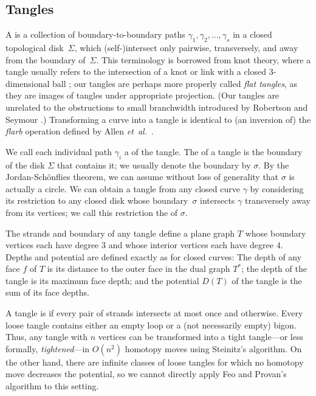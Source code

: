 \documentclass[11pt,twoside]{article}
\def\etal{\emph{et~al.}}			%
\let\EDIT\relax
\numberwithin{figure}{section}
\begin{document}
\subsection{Tangles}
\label{SS:tangles}

A  is a collection of boundary-to-boundary paths $\gamma_1, \gamma_2, \dots,\gamma_s$ in a closed topological disk~$\Sigma$, which (self-)intersect only pairwise, transversely, and away from the boundary of~$\Sigma$.  This terminology is borrowed from knot theory, where a tangle usually refers to the intersection of a knot or link with a closed 3-dimensional ball \cite{c-eklst-70,cdm-ivki-12}; our tangles are perhaps more properly called \emph{flat tangles}, as they are  images of tangles under  appropriate projection.  (Our tangles are unrelated to the obstructions to small branchwidth introduced by Robertson and Seymour \cite{rs-gm10-91}.)  Transforming a curve into a tangle is identical to (an inversion of) the \emph{flarb} operation defined by Allen \etal~\cite{abil-ivd-16}.

We call each individual path $\gamma_i$ a  of the tangle. The  of a tangle is the boundary of the disk $\Sigma$ that contains it; we usually denote the boundary by $\sigma$.  By the Jordan-Schönflies theorem, we can assume without loss of generality that $\sigma$ is actually a circle.  We can obtain a tangle from any closed curve $\gamma$ by considering its restriction to any closed disk whose boundary~$\sigma$ intersects $\gamma$ transversely away from its vertices; we call this restriction the  of $\sigma$. 

The strands and boundary of any tangle define a plane graph $T$ whose boundary vertices each have degree $3$ and whose interior vertices each have degree $4$.  Depths and potential \EDIT{of a tangle} are defined exactly as for closed curves: The depth of any face $f$ of $T$ is its distance to the outer face in the dual graph $T^*$; the depth of the tangle is its maximum face depth; and the potential $D(T)$ of the tangle is the sum of its face depths.

A tangle is  if every pair of strands intersects at most once and  otherwise. Every loose tangle contains either an empty loop or a (not necessarily empty) bigon. Thus, any tangle with $n$ vertices can be transformed into a tight tangle---or less formally, \emph{tightened}---in $O(n^2)$ homotopy moves using Steinitz's algorithm.  On the other hand, there are infinite classes of loose tangles for which no homotopy move \EDIT{that} decreases the potential, so we cannot directly apply Feo and Provan's algorithm to this setting.
\end{document}

